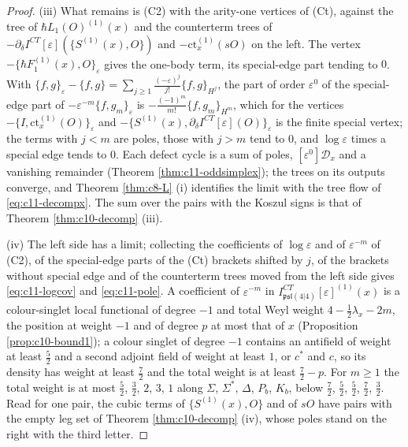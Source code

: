 \begin{proof}
(iii) What remains is (C2) with the arity-one vertices of (Ct), against the tree of $\hbar L_1(O)^{(1)}(x)$ and the counterterm trees of $-\partial_\delta I^{CT}[\varepsilon](\{S^{(1)}(x),O\})$ and $-\mathrm{ct}^{(1)}_x(sO)$ on the left. The vertex $-\{\hbar F_1^{(1)}(x),O\}_\varepsilon$ gives the one-body term, its special-edge part tending to $0$. With $\{f,g\}_\varepsilon-\{f,g\}=\sum_{j\ge1}\frac{(-\varepsilon)^j}{j!}\{f,g\}_{H^j}$, the part of order $\varepsilon^0$ of the special-edge part of $-\varepsilon^{-m}\{f,g_m\}_\varepsilon$ is $-\frac{(-1)^m}{m!}\{f,g_m\}_{H^m}$, which for the vertices $-\{I,\mathrm{ct}^{(1)}_x(O)\}_\varepsilon$ and $-\{S^{(1)}(x),\partial_\delta I^{CT}[\varepsilon](O)\}_\varepsilon$ is the finite special vertex; the terms with $j<m$ are poles, those with $j>m$ tend to $0$, and $\log\varepsilon$ times a special edge tends to $0$. Each defect cycle is a sum of poles, $[\varepsilon^0]\mathcal D_x$ and a vanishing remainder (Theorem \ref{thm:c11-oddsimplex}); the trees on its outputs converge, and Theorem \ref{thm:c8-L} (i) identifies the limit with the tree flow of \eqref{eq:c11-decompx}. The sum over the pairs with the Koszul signs is that of Theorem \ref{thm:c10-decomp} (iii).

(iv) The left side has a limit; collecting the coefficients of $\log\varepsilon$ and of $\varepsilon^{-m}$ of (C2), of the special-edge parts of the (Ct) brackets shifted by $j$, of the brackets without special edge and of the counterterm trees moved from the left side gives \eqref{eq:c11-logcov} and \eqref{eq:c11-pole}. A coefficient of $\varepsilon^{-m}$ in $I^{CT}_{\mathfrak{psl}(4|4)}[\varepsilon]^{(1)}(x)$ is a colour-singlet local functional of degree $-1$ and total Weyl weight $4-\tfrac12\lambda_x-2m$, the position at weight $-1$ and of degree $p$ at most that of $x$ (Proposition \ref{prop:c10-bound1}); a colour singlet of degree $-1$ contains an antifield of weight at least $\tfrac52$ and a second adjoint field of weight at least $1$, or $c^*$ and $c$, so its density has weight at least $\tfrac72$ and the total weight is at least $\tfrac72-p$. For $m\ge1$ the total weight is at most $\tfrac52$, $\tfrac32$, $2$, $3$, $1$ along $\Sigma$, $\Sigma^*$, $\Delta$, $P_b$, $K_b$, below $\tfrac72$, $\tfrac52$, $\tfrac52$, $\tfrac72$, $\tfrac32$. Read for one pair, the cubic terms of $\{S^{(1)}(x),O\}$ and of $sO$ have pairs with the empty leg set of Theorem \ref{thm:c10-decomp} (iv), whose poles stand on the right with the third letter.


\end{proof}
